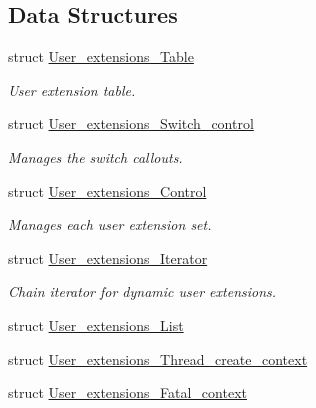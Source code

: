 \subsection*{Data Structures}
\begin{DoxyCompactItemize}
\item 
struct \mbox{\hyperlink{structUser__extensions__Table}{User\+\_\+extensions\+\_\+\+Table}}
\begin{DoxyCompactList}\small\item\em User extension table. \end{DoxyCompactList}\item 
struct \mbox{\hyperlink{structUser__extensions__Switch__control}{User\+\_\+extensions\+\_\+\+Switch\+\_\+control}}
\begin{DoxyCompactList}\small\item\em Manages the switch callouts. \end{DoxyCompactList}\item 
struct \mbox{\hyperlink{structUser__extensions__Control}{User\+\_\+extensions\+\_\+\+Control}}
\begin{DoxyCompactList}\small\item\em Manages each user extension set. \end{DoxyCompactList}\item 
struct \mbox{\hyperlink{structUser__extensions__Iterator}{User\+\_\+extensions\+\_\+\+Iterator}}
\begin{DoxyCompactList}\small\item\em Chain iterator for dynamic user extensions. \end{DoxyCompactList}\item 
struct \mbox{\hyperlink{structUser__extensions__List}{User\+\_\+extensions\+\_\+\+List}}
\item 
struct \mbox{\hyperlink{structUser__extensions__Thread__create__context}{User\+\_\+extensions\+\_\+\+Thread\+\_\+create\+\_\+context}}
\item 
struct \mbox{\hyperlink{structUser__extensions__Fatal__context}{User\+\_\+extensions\+\_\+\+Fatal\+\_\+context}}
\end{DoxyCompactItemize}
